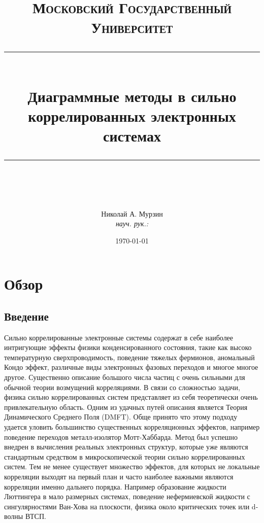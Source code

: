 \documentclass[11pt,a4paper]{report}
\begin{document}
\newcommand{\horrule}[1]{\rule{\linewidth}{#1}}   %

\title{
  \vspace{-1in}
  \normalfont \normalsize \textsc{Московский Государственный Университет} \\ [25pt]
  \horrule{0.5pt} \\[0.4cm]
  \huge Диаграммные методы в сильно коррелированных электронных системах \\
  \horrule{2pt} \\[0.5cm]
}
\author{
  \normalfont
  \normalsize
  {Николай А. Мурзин}\\[-3pt]
  \normalsize
  {\it{науч. рук.:} }\\[-3pt]
  \normalsize
}
\date{\today}
\maketitle
\tableofcontents

\chapter{Обзор}

\section{Введение}

Сильно коррелированные электронные системы содержат в себе наиболее интригующие эффекты физики конденсированного состояния, такие как высоко температурную сверхпроводимость, 
поведение тяжелых фермионов, аномальный Кондо эффект, различные виды электронных фазовых переходов и многое многое другое\cite{anderson1984basic}\cite{anderson1997theory}\cite{scalapino1995case}\cite{hewson1997kondo}.
Существенно описание большого числа частиц с очень сильными для обычной теории возмущений корреляциями. В связи со сложностью задачи, физика сильно коррелированных систем представляет из себя теоретически очень привлекательную область.
Одним из удачных путей описания является Теория Динамического Среднего Поля (DMFT)\cite{georges1996dynamical}\cite{kotliar2004strongly}. Обще принято что этому подходу удается уловить большинство существенных корреляционных эффектов, например поведение
переходов металл-изолятор Мотт-Хаббарда\cite{mott1974metal}. Метод был успешно внедрен в вычисления реальных электронных структур\cite{anisimov1997first}\cite{lichtenstein1998ab}, которые уже являются стандартным средством в микроскопической теории сильно коррелированных систем.
Тем не менее существует множество эффектов, для которых не локальные корреляции выходят на первый план и часто наиболее важными являются корреляции именно дальнего порядка. 
Например образование жидкости Люттингера в мало размерных системах\cite{anderson1997theory}\cite{mahan2000many}, поведение нефермиевской жидкости с сингулярностями Ван-Хова на плоскости\cite{irkhin2001effects}\cite{irkhin2002robustness},
физика около критических точек или d-волны ВТСП\cite{scalapino1995case}.
\end{document}
